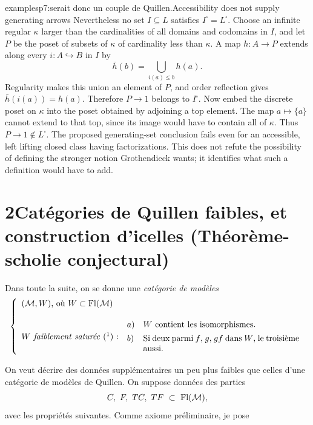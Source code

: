 \begin{dcomment}{examples}{p7:serait donc un couple de Quillen.}{Accessibility does not supply generating arrows}
Nevertheless no set $I\subseteq L$ satisfies $I^{\square}=L^{\square}$. Choose an infinite regular $\kappa$ larger than the cardinalities of all domains and codomains in $I$, and let $P$ be the poset of subsets of $\kappa$ of cardinality less than $\kappa$. A map $h:A\to P$ extends along every $i:A\hookrightarrow B$ in $I$ by
\[
 \bar h(b)=\bigcup_{i(a)\leq b}h(a).
\]
Regularity makes this union an element of $P$, and order reflection gives $\bar h(i(a))=h(a)$. Therefore $P\to1$ belongs to $I^{\square}$. Now embed the discrete poset on $\kappa$ into the poset obtained by adjoining a top element. The map $a\mapsto\{a\}$ cannot extend to that top, since its image would have to contain all of $\kappa$. Thus $P\to1\notin L^{\square}$. The proposed generating-set conclusion fails even for an accessible, left lifting closed class having factorizations. This does not refute the possibility of defining the stronger notion Grothendieck wants; it identifies what such a definition would have to add.
\end{dcomment}


\section*{2\quad Catégories de Quillen faibles, et construction d'icelles (Théorème-scholie conjectural)}

Dans toute la suite, on se donne une \textit{catégorie de modèles}
\[
\left\{
\begin{array}{ll}
\mbox{$(\cM,W)$, où $W\subset\Fl(\cM)$} & \\[3ex]
\mbox{\textit{$W$ faiblement saturée} (\footnotemark) :} &
\begin{array}[c]{@{}l@{\quad}p{6.5cm}@{}}
a) & $W$ contient les isomorphismes.\\[1ex]
b) & Si deux parmi $f$, $g$, $gf$ dans $W$, le troisième aussi.
\end{array}
\end{array}
\right.
\]

On veut décrire des données supplémentaires un peu plus faibles que celles d'une catégorie de modèles de Quillen. On suppose données des parties
\[
C,\ F,\ TC,\ TF\ \subset\ \Fl(\cM),
\]
avec les propriétés suivantes. Comme axiome préliminaire, je pose


